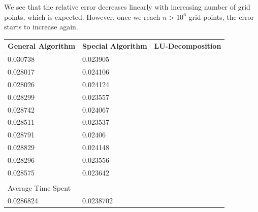\documentclass[a4paper,10pt]{article}
\begin{document}
We see that the relative error decreases linearly with increasing number of grid points, which is expected. However, once we reach $n > 10^6$ grid points, the error starts to increase again. 



\begin{table}[]  \label{fig:5}
\begin{tabular}{lll}
\hline
General Algorithm  & Special Algorithm & LU-Decomposition \\
\hline
0.030738           & 0.023905          &                  \\
0.028017           & 0.024106          &                  \\
0.028026           & 0.024124          &                  \\
0.028299           & 0.023557          &                  \\
0.028742           & 0.024067          &                  \\
0.028511           & 0.023537          &                  \\
0.028791           & 0.02406           &                  \\
0.028829           & 0.024148          &                  \\
0.028296           & 0.023556          &                  \\
0.028575           & 0.023642          &                  \\
                   &                   &                  \\\hline
Average Time Spent &                   &                  \\
\hline
0.0286824          & 0.0238702         &                 
\end{tabular}
\end{table}
\end{document}
